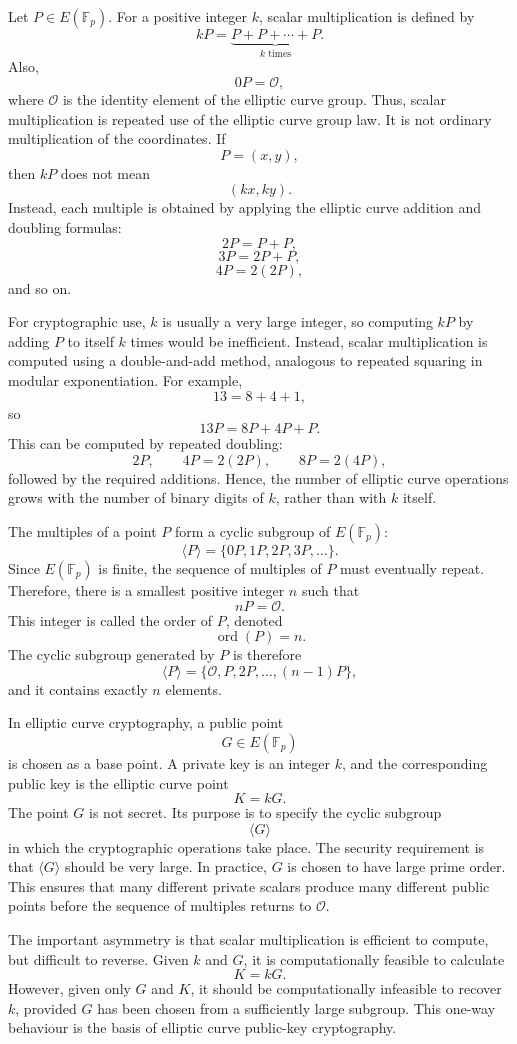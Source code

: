 \documentclass[12pt,a4paper]{article}
\begin{document}
Let \(P \in E(\mathbb{F}_p)\). For a positive integer \(k\), scalar multiplication is defined by
\[kP=\underbrace{P+P+\cdots+P}_{k\text{ times}}.\]
Also,
\[0P=\mathcal{O},\]
where \(\mathcal{O}\) is the identity element of the elliptic curve group. Thus, scalar multiplication is repeated use of the elliptic curve group law. It is not ordinary multiplication of the coordinates. If
\[P=(x,y),\]
then \(kP\) does not mean
\[(kx,ky).\]
Instead, each multiple is obtained by applying the elliptic curve addition and doubling formulas:
\[2P=P+P,\]
\[3P=2P+P,\]
\[4P=2(2P),\]
and so on.

For cryptographic use, \(k\) is usually a very large integer, so computing \(kP\) by adding \(P\) to itself \(k\) times would be inefficient. Instead, scalar multiplication is computed using a double-and-add method, analogous to repeated squaring in modular exponentiation. For example,
\[13=8+4+1,\]
so
\[13P=8P+4P+P.\]
This can be computed by repeated doubling:
\[2P, \qquad 4P=2(2P), \qquad 8P=2(4P),\]
followed by the required additions. Hence, the number of elliptic curve operations grows with the number of binary digits of \(k\), rather than with \(k\) itself.

The multiples of a point \(P\) form a cyclic subgroup of \(E(\mathbb{F}_p)\):
\[\langle P\rangle=\{0P,1P,2P,3P,\ldots\}.\]
Since \(E(\mathbb{F}_p)\) is finite, the sequence of multiples of \(P\) must eventually repeat. Therefore, there is a smallest positive integer \(n\) such that \[nP=\mathcal{O}.\]
This integer is called the order of \(P\), denoted
\[\operatorname{ord}(P)=n.\]
The cyclic subgroup generated by \(P\) is therefore
\[\langle P\rangle=\{\mathcal{O},P,2P,\ldots,(n-1)P\},\]
and it contains exactly \(n\) elements.

In elliptic curve cryptography, a public point
\[G\in E(\mathbb{F}_p)\]
is chosen as a base point. A private key is an integer \(k\), and the corresponding public key is the elliptic curve point
\[K=kG.\]
The point \(G\) is not secret. Its purpose is to specify the cyclic subgroup
\[\langle G\rangle\]
in which the cryptographic operations take place. The security requirement is that \(\langle G\rangle\) should be very large. In practice, \(G\) is chosen to have large prime order. This ensures that many different private scalars produce many different public points before the sequence of multiples returns to \(\mathcal{O}\).

The important asymmetry is that scalar multiplication is efficient to compute, but difficult to reverse. Given \(k\) and \(G\), it is computationally feasible to calculate
\[K=kG.\]
However, given only \(G\) and \(K\), it should be computationally infeasible to recover \(k\), provided \(G\) has been chosen from a sufficiently large subgroup. This one-way behaviour is the basis of elliptic curve public-key cryptography.
\end{document}
